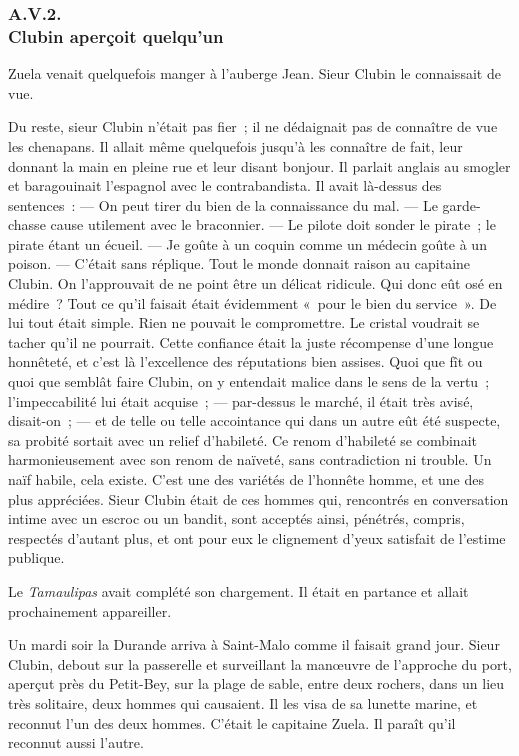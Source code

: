 \documentclass[french,twoside]{book} %
\begin{document}
 \subsubsection[{A.V.2. Clubin aperçoit quelqu’un}]{A.V.2. \\
Clubin aperçoit quelqu’un}
\noindent Zuela venait quelquefois manger à l’auberge Jean. Sieur Clubin le connaissait de vue.\par
Du reste, sieur Clubin n’était pas fier ; il ne dédaignait pas de connaître de vue les chenapans. Il allait même quelquefois jusqu’à les connaître de fait, leur donnant la main en pleine rue et leur disant bonjour. Il parlait anglais au smogler et baragouinait l’espagnol avec le contrabandista. Il avait là-dessus des sentences : — On peut tirer du bien de la connaissance du mal. — Le garde-chasse cause utilement avec le braconnier. — Le pilote doit sonder le pirate ; le pirate étant un écueil. — Je goûte à un coquin comme un médecin goûte à un poison. — C’était sans réplique. Tout le monde donnait raison au capitaine Clubin. On l’approuvait de ne point être un délicat ridicule. Qui donc eût osé en médire ? Tout ce qu’il faisait était évidemment « pour le bien du service ». De lui tout était simple. Rien ne pouvait le compromettre. Le cristal  voudrait se tacher qu’il ne pourrait. Cette confiance était la juste récompense d’une longue honnêteté, et c’est là l’excellence des réputations bien assises. Quoi que fît ou quoi que semblât faire Clubin, on y entendait malice dans le sens de la vertu ; l’impeccabilité lui était acquise ; — par-dessus le marché, il était très avisé, disait-on ; — et de telle ou telle accointance qui dans un autre eût été suspecte, sa probité sortait avec un relief d’habileté. Ce renom d’habileté se combinait harmonieusement avec son renom de naïveté, sans contradiction ni trouble. Un naïf habile, cela existe. C’est une des variétés de l’honnête homme, et une des plus appréciées. Sieur Clubin était de ces hommes qui, rencontrés en conversation intime avec un escroc ou un bandit, sont acceptés ainsi, pénétrés, compris, respectés d’autant plus, et ont pour eux le clignement d’yeux satisfait de l’estime publique.\par
Le \emph{Tamaulipas} avait complété son chargement. Il était en partance et allait prochainement appareiller.\par
Un mardi soir la Durande arriva à Saint-Malo comme il faisait grand jour. Sieur Clubin, debout sur la passerelle et surveillant la manœuvre de l’approche du port, aperçut près du Petit-Bey, sur la plage de sable, entre deux rochers, dans un lieu très solitaire, deux hommes qui causaient. Il les visa de sa lunette marine, et reconnut l’un des deux hommes. C’était le capitaine Zuela. Il paraît qu’il reconnut aussi l’autre.\par
\end{document}
